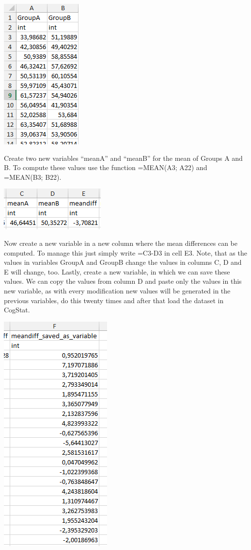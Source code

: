 \documentclass[
]{book}
\begin{document}
\includegraphics{img/ch5/5.4Gab.png}

Create two new variables ``meanA'' and ``meanB'' for the mean of Groups A and B. To compute these values use the function =MEAN(A3; A22) and =MEAN(B3; B22).

\includegraphics{img/ch5/5.4meandiff.png}

Now create a new variable in a new column where the mean differences can be computed. To manage this just simply write =C3-D3 in cell E3. Note, that as the values in variables GroupA and GroupB change the values in columns C, D and E will change, too. Lastly, create a new variable, in which we can save these values. We can copy the values from column D and paste only the values in this new variable, as with every modification new values will be generated in the previous variables, do this twenty times and after that load the dataset in CogStat.

\includegraphics{img/ch5/5.4meandiffvariable.png}
\end{document}
